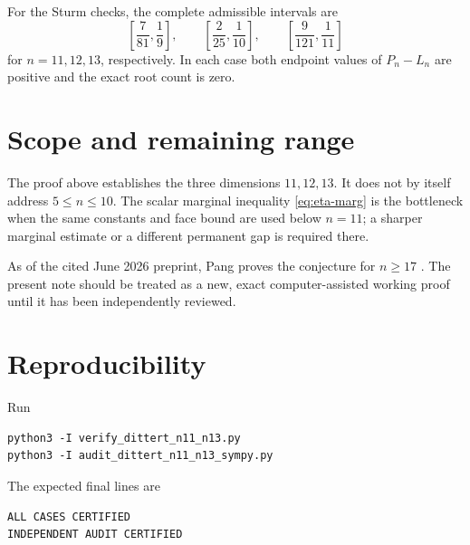 \documentclass[11pt]{article}
\theoremstyle{remark}
\begin{document}
For the Sturm checks, the complete admissible intervals are
\[
 \left[\frac7{81},\frac19\right],\qquad
 \left[\frac2{25},\frac1{10}\right],\qquad
 \left[\frac9{121},\frac1{11}\right]
\]
for $n=11,12,13$, respectively. In each case both endpoint values of $P_n-L_n$ are positive and the exact root count is zero.

\section{Scope and remaining range}
The proof above establishes the three dimensions $11,12,13$. It does not by itself address $5\le n\le10$. The scalar marginal inequality \eqref{eq:eta-marg} is the bottleneck when the same constants and face bound are used below $n=11$; a sharper marginal estimate or a different permanent gap is required there.

As of the cited June 2026 preprint, Pang proves the conjecture for $n\ge17$ \cite{Pang2026}. The present note should be treated as a new, exact computer-assisted working proof until it has been independently reviewed.

\section*{Reproducibility}
Run
\begin{verbatim}
python3 -I verify_dittert_n11_n13.py
python3 -I audit_dittert_n11_n13_sympy.py
\end{verbatim}
The expected final lines are
\begin{verbatim}
ALL CASES CERTIFIED
INDEPENDENT AUDIT CERTIFIED
\end{verbatim}
\end{document}

